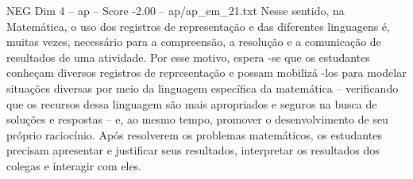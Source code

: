\begin{textsample}{NEG Dim 4 – ap – Score -2.00 – ap/ap\_em\_21.txt}
Nesse sentido, na Matemática, o uso dos registros de representação e das diferentes linguagens é, muitas vezes, necessário para a compreensão, a resolução e a comunicação de resultados de uma atividade.
Por esse motivo, espera -se que os estudantes conheçam diversos registros de representação e possam mobilizá -los para modelar situações diversas por meio da linguagem específica da matemática – verificando que os recursos dessa linguagem são mais apropriados e seguros na busca de soluções e respostas – e, ao mesmo tempo, promover o desenvolvimento de seu próprio raciocínio.
Após resolverem os problemas matemáticos, os estudantes precisam apresentar e justificar seus resultados, interpretar os resultados dos colegas e interagir com eles.

\end{textsample}
